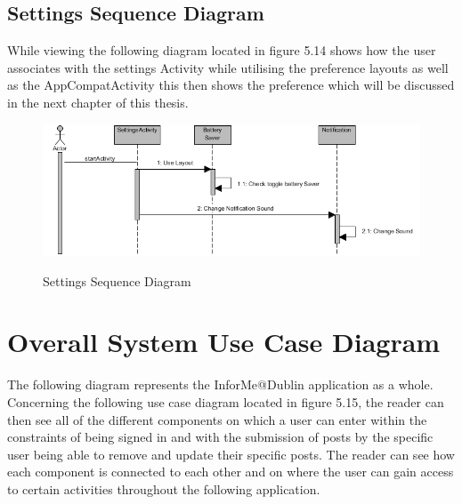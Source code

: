 \subsection{Settings Sequence Diagram}
While viewing the following diagram located in figure 5.14 shows how the user associates with the settings Activity while utilising the preference layouts as well as the AppCompatActivity this then shows the preference which will be discussed in the next chapter of this thesis. 

\begin{figure}[htbp]
    \center \includegraphics[width=450pt]{SequenceDiagramSettings}\\
    \caption{Settings Sequence Diagram} \label{Figure: Settings Sequence Diagram }
\end{figure}

\section{Overall System Use Case Diagram}
The following diagram represents the InforMe@Dublin application as a whole. Concerning the following use case diagram located in figure 5.15, the reader can then see all of the different components on which a user can enter within the constraints of being signed in and with the submission of posts by the specific user being able to remove and update their specific posts. The reader can see how each component is connected to each other and on where the user can gain access to certain activities throughout the following application.\par

